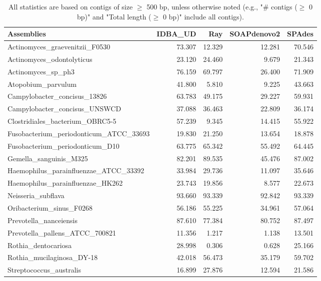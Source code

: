 \documentclass[12pt,a4paper]{article}
\begin{document}
\begin{table}[ht]
\begin{center}
\caption{All statistics are based on contigs of size $\geq$ 500 bp, unless otherwise noted (e.g., "\# contigs ($\geq$ 0 bp)" and "Total length ($\geq$ 0 bp)" include all contigs).}
\begin{tabular}{|l*{4}{|r}|}
\hline
Assemblies & IDBA\_UD & Ray & SOAPdenovo2 & SPAdes \\ \hline
Actinomyces\_graevenitzii\_F0530 & 73.307 & 12.329 & 12.281 & 70.546 \\ \hline
Actinomyces\_odontolyticus & 23.120 & 24.460 & 9.679 & 21.343 \\ \hline
Actinomyces\_sp\_ph3 & 76.159 & 69.797 & 26.400 & 71.909 \\ \hline
Atopobium\_parvulum & 41.800 & 5.810 & 9.225 & 43.663 \\ \hline
Campylobacter\_concisus\_13826 & 63.783 & 49.175 & 29.227 & 59.931 \\ \hline
Campylobacter\_concisus\_UNSWCD & 37.088 & 36.463 & 22.809 & 36.174 \\ \hline
Clostridiales\_bacterium\_OBRC5-5 & 57.239 & 9.345 & 14.415 & 55.922 \\ \hline
Fusobacterium\_periodonticum\_ATCC\_33693 & 19.830 & 21.250 & 13.654 & 18.878 \\ \hline
Fusobacterium\_periodonticum\_D10 & 63.775 & 65.342 & 55.492 & 64.445 \\ \hline
Gemella\_sanguinis\_M325 & 82.201 & 89.535 & 45.476 & 87.002 \\ \hline
Haemophilus\_parainfluenzae\_ATCC\_33392 & 33.984 & 29.736 & 11.097 & 35.646 \\ \hline
Haemophilus\_parainfluenzae\_HK262 & 23.743 & 19.856 & 8.577 & 22.673 \\ \hline
Neisseria\_subflava & 93.660 & 93.339 & 92.842 & 93.339 \\ \hline
Oribacterium\_sinus\_F0268 & 56.186 & 55.225 & 34.961 & 57.064 \\ \hline
Prevotella\_nanceiensis & 87.610 & 77.384 & 80.752 & 87.497 \\ \hline
Prevotella\_pallens\_ATCC\_700821 & 11.356 & 1.217 & 1.138 & 13.501 \\ \hline
Rothia\_dentocariosa & 28.998 & 0.306 & 0.628 & 25.166 \\ \hline
Rothia\_mucilaginosa\_DY-18 & 42.018 & 56.473 & 35.179 & 59.702 \\ \hline
Streptococcus\_australis & 16.899 & 27.876 & 12.594 & 21.586 \\ \hline

\end{tabular}
\end{center}
\end{table}
\end{document}
